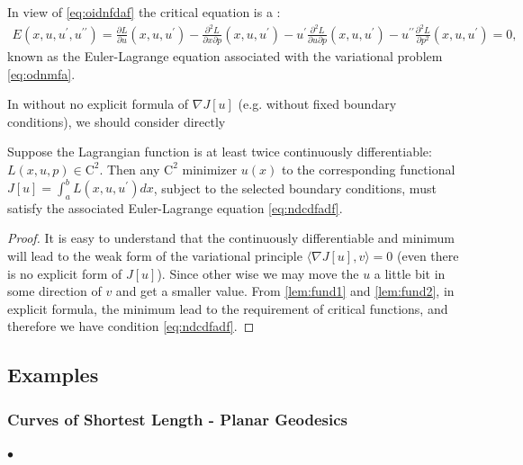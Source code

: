 \documentclass{article}
\begin{document}
In view of \cref{eq:oidnfdaf} the critical equation is a :
\begin{align}
E\left(x, u, u^{\prime}, u^{\prime \prime}\right)=\frac{\partial L}{\partial u}\left(x, u, u^{\prime}\right)-\frac{\partial^{2} L}{\partial x \partial p}\left(x, u, u^{\prime}\right)-u^{\prime} \frac{\partial^{2} L}{\partial u \partial p}\left(x, u, u^{\prime}\right)-u^{\prime \prime} \frac{\partial^{2} L}{\partial p^{2}}\left(x, u, u^{\prime}\right)=0,\label{eq:dnfnadfdf}
\end{align}
known as the {Euler-Lagrange equation} associated with the variational problem \cref{eq:odnmfa}.
\begin{rema} \label{re:lccz} In  without no explicit formula of $\nabla J[u]$ (e.g. without fixed boundary conditions), we should consider directly 
\end{rema}
\begin{thma}
Suppose the Lagrangian function is at least twice continuously differentiable: $L(x, u, p) \in \mathrm{C}^{2}$. Then any $\mathrm{C}^{2}$ minimizer $u(x)$ to the corresponding functional $J[u]=\int_{a}^{b} L\left(x, u, u^{\prime}\right) d x$, subject to the selected boundary conditions, must satisfy the associated Euler-Lagrange equation \cref{eq:ndcdfadf}.
\end{thma}
\begin{proof}
It is easy to understand that the continuously differentiable and minimum will lead to the weak form of the variational principle $\langle\nabla J[u], v\rangle=0$ (even there is no explicit form of $J[u]$). Since other wise we may move the $u$ a little bit in some direction of $v$ and get a smaller value. From \cref{lem:fund1} and \cref{lem:fund2}, in explicit formula, the minimum lead to the requirement of critical functions, and therefore we have condition \cref{eq:ndcdfadf}.
\end{proof}
\subsection{Examples}
\subsubsection{Curves of Shortest Length - Planar Geodesics}\label{sec:planargeo}
$\bullet$ 
\end{document}
